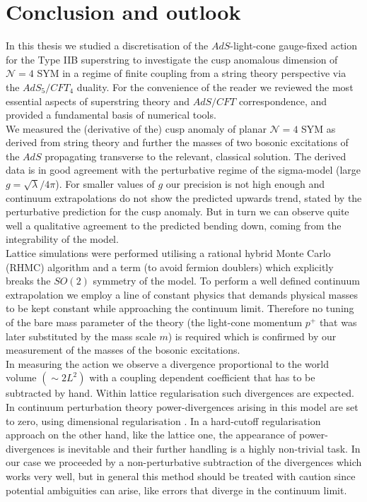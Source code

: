 \chapter{Conclusion and outlook}\label{ch: conclusion}
In this thesis we studied a discretisation of the $AdS$-light-cone gauge-fixed action for the Type IIB  superstring to investigate the cusp anomalous dimension of $\mathcal{N}=4$ SYM in a regime of finite  coupling from a string theory perspective via the $AdS_{5}/CFT_{4}$ duality. For the convenience of the reader we reviewed the most essential aspects of superstring theory and $AdS/CFT$ correspondence, and provided a fundamental basis of numerical tools.\\
We measured the (derivative of the) cusp anomaly of planar $\mathcal{N}=4$ SYM as derived from string theory and further the masses of two bosonic excitations of the $AdS$  propagating transverse to the relevant, classical solution. The derived data is in good agreement with the perturbative regime of the sigma-model (large $g=\sqrt{\lambda}/4\pi$). For smaller values of $g$ our  precision is not high enough and continuum extrapolations do not show the predicted upwards trend, stated by the perturbative prediction for the cusp anomaly. But in turn we can observe quite well a qualitative agreement to the predicted bending down, coming from the integrability of the model.\\
Lattice simulations were performed utilising a rational hybrid Monte Carlo \linebreak(RHMC) algorithm and a  term (to avoid fermion doublers) which explicitly breaks the $SO(2)$ symmetry of the model. To perform a well defined continuum extrapolation we employ a line of constant physics that demands physical masses to be kept constant while approaching the continuum limit. Therefore no tuning of the bare mass parameter of the theory (the light-cone momentum $p^{+}$ that was later substituted by the mass scale $m$) is required which is confirmed by our measurement of the masses of the bosonic excitations.\\
In measuring the action we observe a divergence proportional to the world volume $(\sim 2L^{2})$ with a coupling dependent coefficient that has to be subtracted by hand. Within lattice regularisation such divergences are expected. In continuum perturbation theory power-divergences arising in this model are set to zero, using dimensional regularisation \cite{Giombi:2009gd}. In a hard-cutoff regularisation approach on the other hand, like the lattice one, the appearance of power-divergences is inevitable and their further handling is a highly non-trivial task. In our case we proceeded by a non-perturbative subtraction of the divergences which works very well, but in general this method should be treated with caution since potential ambiguities can arise, like errors that diverge in the continuum limit.\\
